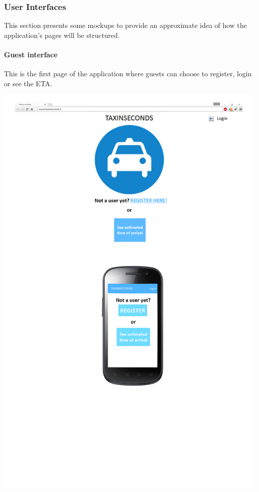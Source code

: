 \documentclass{article}
\begin{document}
\subsubsection{User Interfaces}
This section presents some mockups to provide an approximate idea of how the application's pages will be structured.
\clearpage
\paragraph{Guest interface}
This is the first page of the application where guests can choose to register, login or see the ETA.\\
\begin{center}
	\includegraphics[width=.9\textwidth,height=.9\textheight,keepaspectratio]{GuestInterface}
\end{center}
\clearpage
\end{document}
